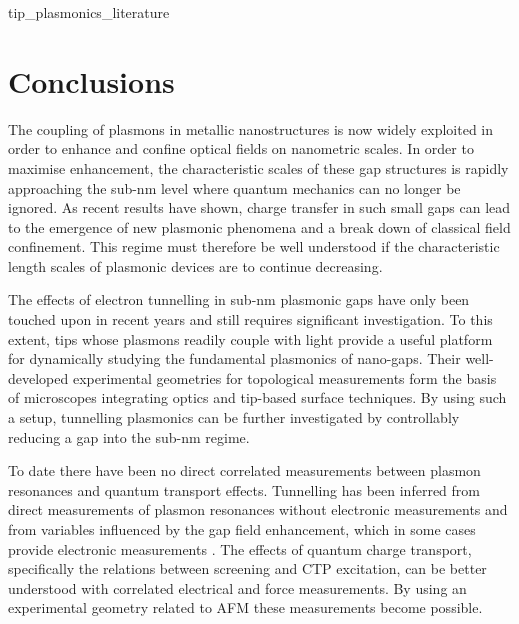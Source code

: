 \documentclass[12pt, a4paper, oneside]{book}
\begin{document}
{tip_plasmonics_literature}

\section{Conclusions}

The coupling of plasmons in metallic nanostructures is now widely exploited in order to enhance and confine optical fields on nanometric scales. In order to maximise enhancement, the characteristic scales of these gap structures is rapidly approaching the sub-nm level where quantum mechanics can no longer be ignored. As recent results have shown, charge transfer in such small gaps can lead to the emergence of new plasmonic phenomena and a break down of classical field confinement. This regime must therefore be well understood if the characteristic length scales of plasmonic devices are to continue decreasing.

The effects of electron tunnelling in sub-nm plasmonic gaps have only been touched upon in recent years and still requires significant investigation. To this extent, tips whose plasmons readily couple with light provide a useful platform for dynamically studying the fundamental plasmonics of nano-gaps. Their well-developed experimental geometries for topological measurements form the basis of microscopes integrating optics and tip-based surface techniques. By using such a setup, tunnelling plasmonics can be further investigated by controllably reducing a gap into the sub-nm regime.

To date there have been no direct correlated measurements between plasmon resonances and quantum transport effects. Tunnelling has been inferred from direct measurements of plasmon resonances without electronic measurements \cite{savage2012, scholl2013} and from variables influenced by the gap field enhancement, which in some cases provide electronic measurements \cite{tan2014, zhu2014, hajisalem2014, cha2014}. The effects of quantum charge transport, specifically the relations between screening and CTP excitation, can be better understood with correlated electrical and force measurements. By using an experimental geometry related to AFM these measurements become possible.

\ifstandalone
\begin{singlespace}
\fontsize{8pt}{1em}\selectfont
\printbibliography[notcategory=fullcited]
\end{singlespace}
\fi
\end{document}
